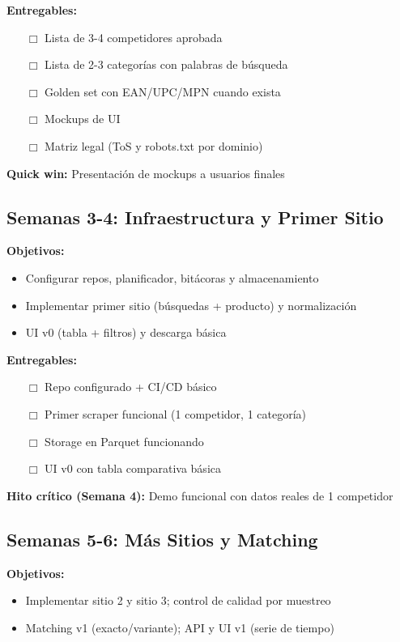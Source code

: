 \documentclass[12pt,a4paper]{article}
\begin{document}
\textbf{Entregables:}
\begin{itemize}[leftmargin=*]
    \item[$\Box$] Lista de 3-4 competidores aprobada
    \item[$\Box$] Lista de 2-3 categorías con palabras de búsqueda
    \item[$\Box$] Golden set con EAN/UPC/MPN cuando exista
    \item[$\Box$] Mockups de UI
    \item[$\Box$] Matriz legal (ToS y robots.txt por dominio)
\end{itemize}

\textbf{\textcolor{successgreen}{Quick win:}} Presentación de mockups a usuarios finales

\subsection{Semanas 3-4: Infraestructura y Primer Sitio}

\textbf{Objetivos:}
\begin{itemize}[leftmargin=*]
    \item Configurar repos, planificador, bitácoras y almacenamiento
    \item Implementar primer sitio (búsquedas + producto) y normalización
    \item UI v0 (tabla + filtros) y descarga básica
\end{itemize}

\textbf{Entregables:}
\begin{itemize}[leftmargin=*]
    \item[$\Box$] Repo configurado + CI/CD básico
    \item[$\Box$] Primer scraper funcional (1 competidor, 1 categoría)
    \item[$\Box$] Storage en Parquet funcionando
    \item[$\Box$] UI v0 con tabla comparativa básica
\end{itemize}

\textbf{\textcolor{primaryblue}{Hito crítico (Semana 4):}} Demo funcional con datos reales de 1 competidor

\subsection{Semanas 5-6: Más Sitios y Matching}

\textbf{Objetivos:}
\begin{itemize}[leftmargin=*]
    \item Implementar sitio 2 y sitio 3; control de calidad por muestreo
    \item Matching v1 (exacto/variante); API y UI v1 (serie de tiempo)
\end{itemize}
\end{document}
